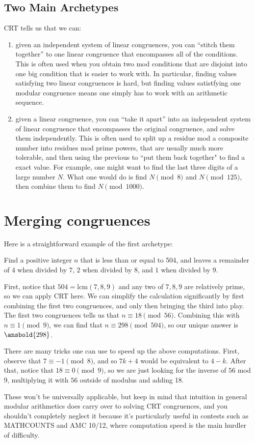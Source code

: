 \documentclass[mast]{lucky}
\begin{document}
\subsection{Two Main Archetypes}
CRT tells us that we can:
\begin{enumerate}
\item given an independent system of linear congruences, you can ``stitch them together'' to one linear congruence that encompasses all of the conditions. This is often used when you obtain two mod conditions that are disjoint into one big condition that is easier to work with. In particular, finding values satisfying two linear congruences is hard, but finding values satistfying one modular congruence means one simply has to work with an arithmetic sequence.
\item given a linear congruence, you can ``take it apart'' into an independent system of linear congruence that encompasses the original congruence, and solve them independently. This is often used to split up a residue mod a composite number into residues mod prime powers, that are usually much more tolerable, and then using the previous to ``put them back together" to find a exact value. For example, one might want to find the last three digits of a large number $N$. What one would do is find $N \pmod{8}$ and $N \pmod{125}$, then combine them to find $N\pmod{1000}$.
\end{enumerate}
\pagebreak

\section{Merging congruences}
Here is a straightforward example of the first archetype:
\begin{exam}
Find a positive integer $n$ that is less than or equal to 504, and leaves a remainder of $4$ when divided by $7$, $2$ when divided by $8$, and $1$ when divided by $9$.
\end{exam}
\begin{sol}
First, notice that $504=\text{lcm}(7,8,9)$ and any two of $7,8,9$ are relatively prime, so we can apply CRT here. We can simplify the calculation significantly by first combining the first two congruences, and only then bringing the third into play.
The first two congruences tells us that $n\equiv 18\pmod{56}$. Combining this with $n\equiv 1\pmod{9}$, we can find that $n\equiv 298\pmod{504}$, so our unique answer is $\ansbold{298}$.
\end{sol}
\begin{remark}
There are many tricks one can use to speed up the above computations. First, observe that $7\equiv -1\pmod{8}$, and so $7k+4$ would be equivalent to $4-k$. After that, notice that $18\equiv 0\pmod{9}$, so we are just looking for the inverse of $56$ mod 9, multiplying it with $56$ outside of modulus and adding 18.

These won't be universally applicable, but keep in mind that intuition in general modular arithmetics does carry over to solving CRT congruences, and you shouldn't completely neglect it because it's particularly useful in contests such as MATHCOUNTS and AMC 10/12, where computation speed is the main hurdler of difficulty.
\end{remark}
\end{document}
